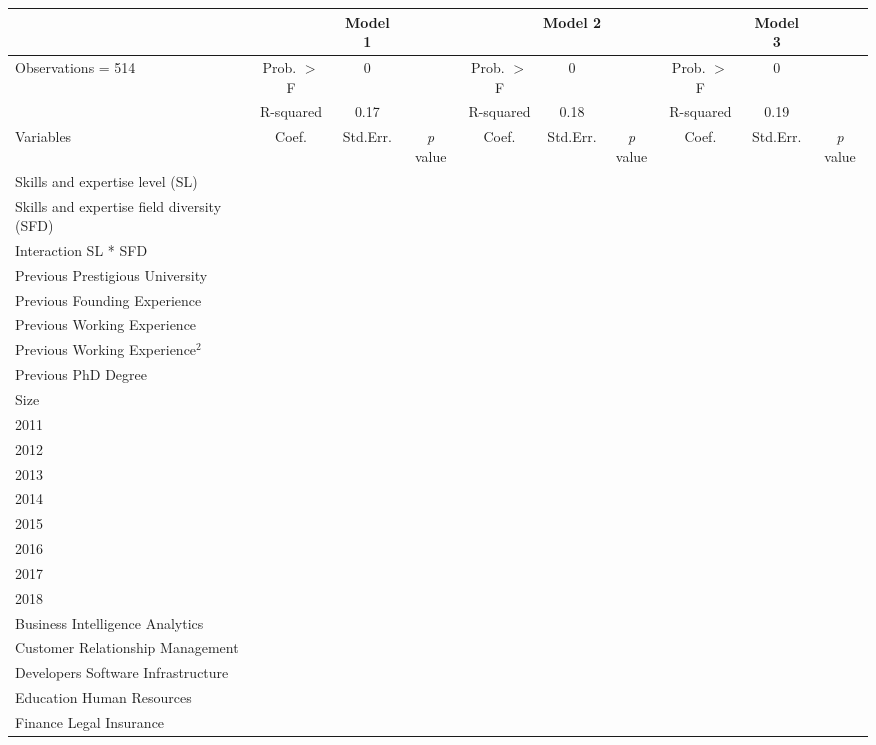 \documentclass[12pt]{article}
\begin{document}
\begin{table} [ht]
\centering
  \tiny
  \begin{tabular}{lccccccccc}
    \toprule
      & & \multicolumn{1}{c}{\textbf{Model 1}} & \multicolumn{5}{c}{\textbf{Model 2}} & \multicolumn{1}{c}{\textbf{Model 3}} & \\
    \hline
      Observations = 514 & Prob. $>$ F & 0 & & Prob. $>$ F & 0 & & Prob. $>$ F & 0 & \\
       & R-squared & 0.17 & & R-squared & 0.18 & & R-squared & 0.19 & \\
    \hline
      Variables & Coef. & Std.Err. & \textit{p} value & Coef. & Std.Err. & \textit{p} value & Coef. & Std.Err. & \textit{p} value \\
    \hline
      Skills and expertise level (SL) & & & & & & & & & \\
      Skills and expertise field diversity (SFD) & & & & & & & & & \\
      Interaction SL * SFD & & & & & & & & & \\
      Previous Prestigious University & & & & & & & & & \\
      Previous Founding Experience & & & & & & & & & \\
      Previous Working Experience & & & & & & & & & \\
      Previous Working Experience$^2$ & & & & & & & & & \\
      Previous PhD Degree & & & & & & & & & \\
      Size & & & & & & & & & \\
      2011 & & & & & & & & & \\
      2012 & & & & & & & & & \\
      2013 & & & & & & & & & \\
      2014 & & & & & & & & & \\
      2015 & & & & & & & & & \\
      2016 & & & & & & & & & \\
      2017 & & & & & & & & & \\
      2018 & & & & & & & & & \\
      Business Intelligence Analytics & & & & & & & & & \\
      Customer Relationship Management & & & & & & & & & \\
      Developers Software Infrastructure & & & & & & & & & \\
      Education Human Resources & & & & & & & & & \\
      Finance Legal Insurance & & & & & & & & & \\

\end{tabular}
\end{table}
\end{document}
